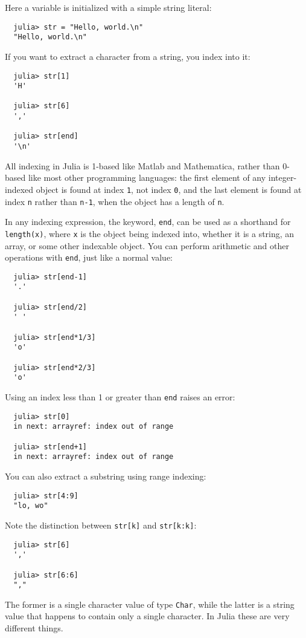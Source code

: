 \documentclass{article}
\begin{document}
Here a variable is initialized with a simple string literal:
\begin{verbatim}
  julia> str = "Hello, world.\n"
  "Hello, world.\n"
\end{verbatim}
If you want to extract a character from a string, you index into it:
\begin{verbatim}
  julia> str[1]
  'H'

  julia> str[6]
  ','

  julia> str[end]
  '\n'
\end{verbatim}
All indexing in Julia is 1-based like Matlab and Mathematica, rather than 0-based like most other programming languages:
the first element of any integer-indexed object is found at index \verb|1|, not index \verb|0|, and the last element is found at index \verb|n| rather than \verb|n-1|, when the object has a length of \verb|n|.

In any indexing expression, the keyword, \verb|end|, can be used as a shorthand for \verb|length(x)|, where \verb|x| is the object being indexed into, whether it is a string, an array, or some other indexable object.
You can perform arithmetic and other operations with \verb|end|, just like a normal value:
\begin{verbatim}
  julia> str[end-1]
  '.'

  julia> str[end/2]
  ' '

  julia> str[end*1/3]
  'o'

  julia> str[end*2/3]
  'o'
\end{verbatim}
Using an index less than 1 or greater than \verb|end| raises an error:
\begin{verbatim}
  julia> str[0]
  in next: arrayref: index out of range

  julia> str[end+1]
  in next: arrayref: index out of range
\end{verbatim}
You can also extract a substring using range indexing:
\begin{verbatim}
  julia> str[4:9]
  "lo, wo"
\end{verbatim}
Note the distinction between \verb|str[k]| and \verb|str[k:k]|:
\begin{verbatim}
  julia> str[6]
  ','

  julia> str[6:6]
  ","
\end{verbatim}
The former is a single character value of type \verb|Char|, while the latter is a string value that happens to contain only a single character.
In Julia these are very different things.
\end{document}
